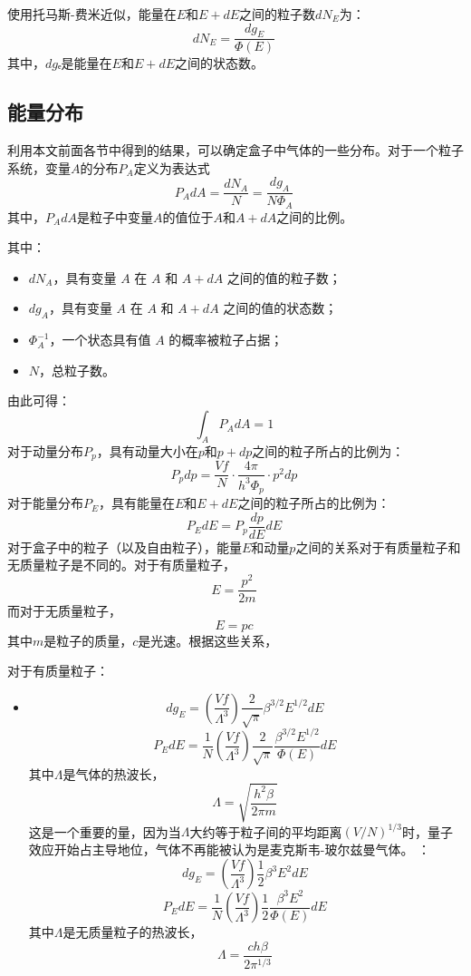 使用托马斯-费米近似，能量在\(E\)和\(E+dE\)之间的粒子数\(dN_E\)为：
\[
dN_E = \frac{dg_E}{\Phi(E)}~
\]
其中，\(dg\)ₑ是能量在\(E\)和\(E+dE\)之间的状态数。
\subsection{能量分布}  
利用本文前面各节中得到的结果，可以确定盒子中气体的一些分布。对于一个粒子系统，变量\( A \)的分布\( P_A \)定义为表达式  
\[
P_A dA = \frac{dN_A}{N} = \frac{dg_A}{N \Phi_A}~
\]
其中，\( P_A dA \)是粒子中变量\( A \)的值位于\( A \)和\( A + dA \)之间的比例。

其中：
\begin{itemize}
\item \( dN_A \)，具有变量 \( A \) 在 \( A \) 和 \( A + dA \) 之间的值的粒子数；
\item \( dg_A \)，具有变量 \( A \) 在 \( A \) 和 \( A + dA \) 之间的值的状态数；
\item \( \Phi_A^{-1} \)，一个状态具有值 \( A \) 的概率被粒子占据；
\item \( N \)，总粒子数。
\end{itemize}
由此可得：
\[
\int_A P_A dA = 1~
\]
对于动量分布\( P_p \)，具有动量大小在\( p \)和\( p + dp \)之间的粒子所占的比例为：
\[
P_p dp = \frac{Vf}{N} \cdot \frac{4\pi}{h^3 \Phi_p} \cdot p^2 dp~
\]
对于能量分布\( P_E \)，具有能量在\( E \)和\( E+dE \)之间的粒子所占的比例为：
\[
P_E dE = P_p \frac{dp}{dE} dE~
\]
对于盒子中的粒子（以及自由粒子），能量\( E \)和动量\( p \)之间的关系对于有质量粒子和无质量粒子是不同的。对于有质量粒子，
\[
E = \frac{p^2}{2m}~
\]
而对于无质量粒子，
\[
E = pc~
\]
其中\( m \)是粒子的质量，\( c \)是光速。根据这些关系，

对于有质量粒子：
\begin{itemize}
\item 
\[
dg_E = \left( \frac{Vf}{\Lambda^3} \right) \frac{2}{\sqrt{\pi}} \beta^{3/2} E^{1/2} dE~
\]
\[
P_E dE = \frac{1}{N} \left( \frac{Vf}{\Lambda^3} \right) \frac{2}{\sqrt{\pi}} \frac{\beta^{3/2} E^{1/2}}{\Phi(E)} dE~
\]
其中\( \Lambda \)是气体的热波长，
\[
\Lambda = \sqrt{\frac{h^2 \beta}{2\pi m}}~
\]
这是一个重要的量，因为当\( \Lambda \)大约等于粒子间的平均距离\( (V/N)^{1/3} \)时，量子效应开始占主导地位，气体不再能被认为是麦克斯韦-玻尔兹曼气体。
：
\[
dg_E = \left( \frac{Vf}{\Lambda^3} \right) \frac{1}{2} \beta^3 E^2 dE~
\]
\[
P_E dE = \frac{1}{N} \left( \frac{Vf}{\Lambda^3} \right) \frac{1}{2} \frac{\beta^3 E^2}{\Phi(E)} dE~
\]
其中\( \Lambda \)是无质量粒子的热波长，
\[
\Lambda = \frac{ch\beta}{2 \pi^{1/3}}~
\]
\end{itemize}